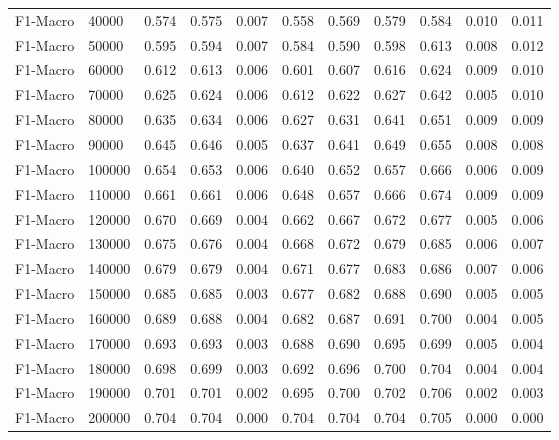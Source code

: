 \begin{table}[htbp]
\begin{table}
\begin{tabular}{ll|rrrrrrr|rr}
F1-Macro & 40000 & 0.574 & 0.575 & 0.007 & 0.558 & 0.569 & 0.579 & 0.584 & 0.010 & 0.011 \\
F1-Macro & 50000 & 0.595 & 0.594 & 0.007 & 0.584 & 0.590 & 0.598 & 0.613 & 0.008 & 0.012 \\
F1-Macro & 60000 & 0.612 & 0.613 & 0.006 & 0.601 & 0.607 & 0.616 & 0.624 & 0.009 & 0.010 \\
F1-Macro & 70000 & 0.625 & 0.624 & 0.006 & 0.612 & 0.622 & 0.627 & 0.642 & 0.005 & 0.010 \\
F1-Macro & 80000 & 0.635 & 0.634 & 0.006 & 0.627 & 0.631 & 0.641 & 0.651 & 0.009 & 0.009 \\
F1-Macro & 90000 & 0.645 & 0.646 & 0.005 & 0.637 & 0.641 & 0.649 & 0.655 & 0.008 & 0.008 \\
F1-Macro & 100000 & 0.654 & 0.653 & 0.006 & 0.640 & 0.652 & 0.657 & 0.666 & 0.006 & 0.009 \\
F1-Macro & 110000 & 0.661 & 0.661 & 0.006 & 0.648 & 0.657 & 0.666 & 0.674 & 0.009 & 0.009 \\
F1-Macro & 120000 & 0.670 & 0.669 & 0.004 & 0.662 & 0.667 & 0.672 & 0.677 & 0.005 & 0.006 \\
F1-Macro & 130000 & 0.675 & 0.676 & 0.004 & 0.668 & 0.672 & 0.679 & 0.685 & 0.006 & 0.007 \\
F1-Macro & 140000 & 0.679 & 0.679 & 0.004 & 0.671 & 0.677 & 0.683 & 0.686 & 0.007 & 0.006 \\
F1-Macro & 150000 & 0.685 & 0.685 & 0.003 & 0.677 & 0.682 & 0.688 & 0.690 & 0.005 & 0.005 \\
F1-Macro & 160000 & 0.689 & 0.688 & 0.004 & 0.682 & 0.687 & 0.691 & 0.700 & 0.004 & 0.005 \\
F1-Macro & 170000 & 0.693 & 0.693 & 0.003 & 0.688 & 0.690 & 0.695 & 0.699 & 0.005 & 0.004 \\
F1-Macro & 180000 & 0.698 & 0.699 & 0.003 & 0.692 & 0.696 & 0.700 & 0.704 & 0.004 & 0.004 \\
F1-Macro & 190000 & 0.701 & 0.701 & 0.002 & 0.695 & 0.700 & 0.702 & 0.706 & 0.002 & 0.003 \\
F1-Macro & 200000 & 0.704 & 0.704 & 0.000 & 0.704 & 0.704 & 0.704 & 0.705 & 0.000 & 0.000 \\
\bottomrule
\end{tabular}
\end{table}
\end{table}
